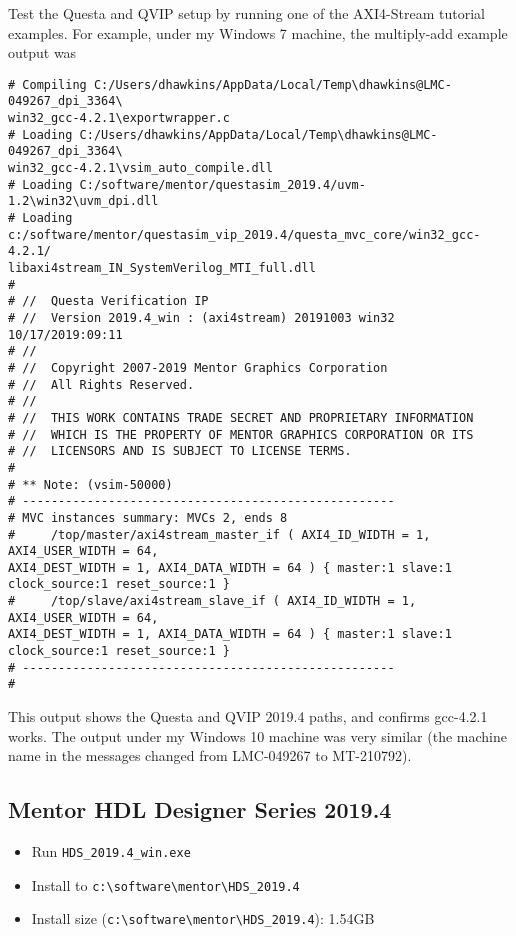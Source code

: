 \documentclass[10pt,twoside]{article}
\begin{document}
Test the Questa and QVIP setup by running one of the AXI4-Stream tutorial
examples. For example, under my Windows 7 machine, the multiply-add example
output was
%
\begin{verbatim}
# Compiling C:/Users/dhawkins/AppData/Local/Temp\dhawkins@LMC-049267_dpi_3364\
win32_gcc-4.2.1\exportwrapper.c
# Loading C:/Users/dhawkins/AppData/Local/Temp\dhawkins@LMC-049267_dpi_3364\
win32_gcc-4.2.1\vsim_auto_compile.dll
# Loading C:/software/mentor/questasim_2019.4/uvm-1.2\win32\uvm_dpi.dll
# Loading c:/software/mentor/questasim_vip_2019.4/questa_mvc_core/win32_gcc-4.2.1/
libaxi4stream_IN_SystemVerilog_MTI_full.dll
#
# //  Questa Verification IP
# //  Version 2019.4_win : (axi4stream) 20191003 win32 10/17/2019:09:11
# //
# //  Copyright 2007-2019 Mentor Graphics Corporation
# //  All Rights Reserved.
# //
# //  THIS WORK CONTAINS TRADE SECRET AND PROPRIETARY INFORMATION
# //  WHICH IS THE PROPERTY OF MENTOR GRAPHICS CORPORATION OR ITS
# //  LICENSORS AND IS SUBJECT TO LICENSE TERMS.
#
# ** Note: (vsim-50000)
# ----------------------------------------------------
# MVC instances summary: MVCs 2, ends 8
#     /top/master/axi4stream_master_if ( AXI4_ID_WIDTH = 1, AXI4_USER_WIDTH = 64,
AXI4_DEST_WIDTH = 1, AXI4_DATA_WIDTH = 64 ) { master:1 slave:1 clock_source:1 reset_source:1 }
#     /top/slave/axi4stream_slave_if ( AXI4_ID_WIDTH = 1, AXI4_USER_WIDTH = 64,
AXI4_DEST_WIDTH = 1, AXI4_DATA_WIDTH = 64 ) { master:1 slave:1 clock_source:1 reset_source:1 }
# ----------------------------------------------------
#
\end{verbatim}
%
This output shows the Questa and QVIP 2019.4 paths, and confirms gcc-4.2.1 works.
The output under my Windows 10 machine was very similar (the machine name in the
messages changed from LMC-049267 to MT-210792).

\clearpage
\subsection{Mentor HDL Designer Series 2019.4}

\begin{itemize}
\item Run \verb+HDS_2019.4_win.exe+
\item Install to
\verb+c:\software\mentor\HDS_2019.4+
\item Install size (\verb+c:\software\mentor\HDS_2019.4+): 1.54GB
\end{itemize}
\end{document}
